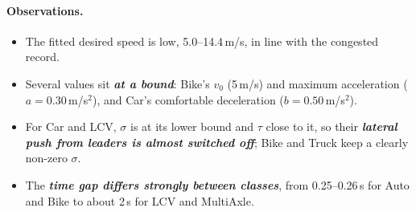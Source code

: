 \documentclass[11pt]{article}
\newcommand{\key}[1]{\textbf{\textit{#1}}}
\begin{document}
\begin{table}[H]\centering\footnotesize
\caption{Class parameters of the run with IDM fixed at a single set \cite{chandra}.
Italic: fixed, not calibrated. Trailer uses the MultiAxle column.}
\label{tab:parchandra}

\end{table}
\begin{table}[H]\centering\footnotesize
\caption{Class parameters of the run with IDM fixed per class at the values
of \cite{duggal} (Auto, Bike, Car) and extrapolated values (LCV, Truck, MultiAxle).
Italic: fixed, not calibrated.}
\label{tab:parduggal}

\end{table}

\begin{table}[H]\centering\footnotesize
\caption{Class parameters of the run with all parameters free. Italic: fixed
($\delta$).}
\label{tab:parfree}

\end{table}

\paragraph{Observations.}
\begin{itemize}\setlength{\itemsep}{1pt}
\item The fitted desired speed is low, 5.0--14.4\,m/s, in line with the
congested record.
\item Several values sit \key{at a bound}: Bike's $v_0$ (5\,m/s) and maximum
acceleration ($a=0.30$\,m/s$^2$), and Car's comfortable deceleration
($b=0.50$\,m/s$^2$).
\item For Car and LCV, $\sigma$ is at its lower bound and $\tau$ close to it, so
their \key{lateral push from leaders is almost switched off}; Bike and Truck keep
a clearly non-zero $\sigma$.
\item The \key{time gap differs strongly between classes}, from 0.25--0.26\,s
for Auto and Bike to about 2\,s for LCV and MultiAxle.
\end{itemize}
\end{document}
